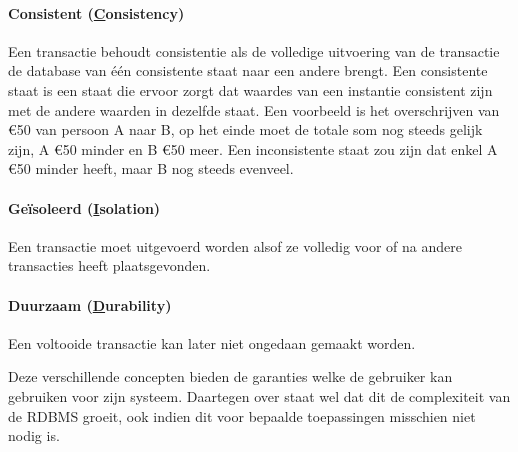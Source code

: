 \paragraph{Consistent (\underline{C}onsistency)} Een transactie behoudt consistentie als de volledige uitvoering van de transactie de database van één consistente staat naar een andere brengt. Een consistente staat is een staat die ervoor zorgt dat waardes van een instantie consistent zijn met de andere waarden in dezelfde staat. Een voorbeeld is het overschrijven van \euro{50} van persoon A naar B, op het einde moet de totale som nog steeds gelijk zijn, A \euro{50} minder en B \euro{50} meer. Een inconsistente staat zou zijn dat enkel A \euro{50} minder heeft, maar B nog steeds evenveel. 

\paragraph{Geïsoleerd (\underline{I}solation)} Een transactie moet uitgevoerd worden alsof ze volledig voor of na andere transacties heeft plaatsgevonden. 

\paragraph{Duurzaam (\underline{D}urability)} Een voltooide transactie kan later niet ongedaan gemaakt worden.

Deze verschillende concepten bieden de garanties welke de gebruiker kan gebruiken voor zijn systeem. Daartegen over staat wel dat dit de complexiteit van de RDBMS groeit, ook indien dit voor bepaalde toepassingen misschien niet nodig is.

